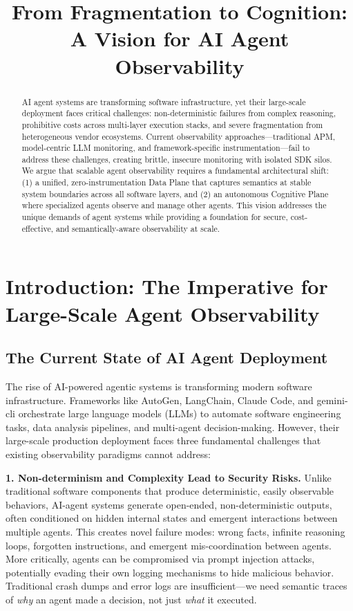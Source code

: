 \documentclass[sigplan,screen，review,9pt]{acmart}
\begin{document}
\title{From Fragmentation to Cognition: A Vision for AI Agent Observability}


\author{}


\sloppy
\begin{abstract}
AI agent systems are transforming software infrastructure, yet their large-scale deployment faces critical challenges: non-deterministic failures from complex reasoning, prohibitive costs across multi-layer execution stacks, and severe fragmentation from heterogeneous vendor ecosystems. Current observability approaches—traditional APM, model-centric LLM monitoring, and framework-specific instrumentation—fail to address these challenges, creating brittle, insecure monitoring with isolated SDK silos. We argue that scalable agent observability requires a fundamental architectural shift: (1) a unified, zero-instrumentation Data Plane that captures semantics at stable system boundaries across all software layers, and (2) an autonomous Cognitive Plane where specialized agents observe and manage other agents. This vision addresses the unique demands of agent systems while providing a foundation for secure, cost-effective, and semantically-aware observability at scale.
\end{abstract}


\maketitle



\section{Introduction: The Imperative for Large-Scale Agent Observability}

\subsection{The Current State of AI Agent Deployment}

The rise of AI-powered agentic systems is transforming modern software infrastructure. Frameworks like AutoGen, LangChain, Claude Code, and gemini-cli orchestrate large language models (LLMs) to automate software engineering tasks, data analysis pipelines, and multi-agent decision-making. However, their large-scale production deployment faces three fundamental challenges that existing observability paradigms cannot address:

\textbf{1. Non-determinism and Complexity Lead to Security Risks.} Unlike traditional software components that produce deterministic, easily observable behaviors, AI-agent systems generate open-ended, non-deterministic outputs, often conditioned on hidden internal states and emergent interactions between multiple agents. This creates novel failure modes: wrong facts, infinite reasoning loops, forgotten instructions, and emergent mis-coordination between agents. More critically, agents can be compromised via prompt injection attacks, potentially evading their own logging mechanisms to hide malicious behavior. Traditional crash dumps and error logs are insufficient—we need semantic traces of \emph{why} an agent made a decision, not just \emph{what} it executed.
\end{document}
